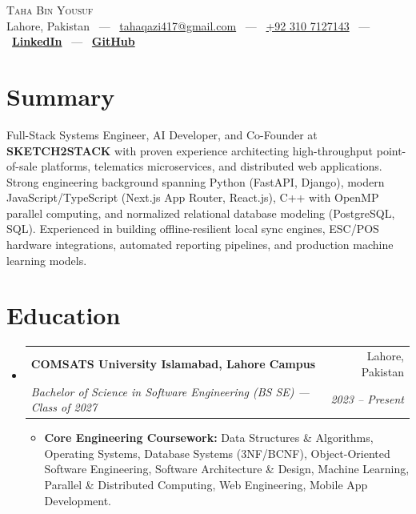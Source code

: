 \documentclass[letterpaper,10pt]{article}
\makeatletter
\newcommand{\resumeItem}[1]{
  \item\small{
    {#1 \vspace{-1.5pt}}
  }
}
\newcommand{\resumeSubheading}[4]{
  \vspace{1.5pt}\item
    \begin{tabular*}{0.98\textwidth}[t]{l@{\extracolsep{\fill}}r}
      \textbf{#1} & #2 \\
      \textit{\small#3} & \textit{\small #4} \\
    \end{tabular*}\vspace{-4pt}
}
\newcommand{\resumeSubHeadingListStart}{\begin{itemize}[leftmargin=0.15in, label={}]}
\newcommand{\resumeSubHeadingListEnd}{\end{itemize}\vspace{-2pt}}
\newcommand{\resumeItemListStart}{\begin{itemize}[leftmargin=0.15in]}
\newcommand{\resumeItemListEnd}{\end{itemize}\vspace{-3pt}}
\makeatother
\begin{document}

\begin{center}
    {\Huge \scshape Taha Bin Yousuf} \\ \vspace{5pt}
    \small Lahore, Pakistan \ --- \ 
    \href{mailto:tahaqazi417@gmail.com}{tahaqazi417@gmail.com} \ --- \ 
    \href{tel:+923107127143}{+92 310 7127143} \ --- \ 
    \href{https://linkedin.com/in/taha-bin-yousuf-851726414}{\textbf{LinkedIn}} \ --- \ 
    \href{https://github.com/taha-qazi}{\textbf{GitHub}}
\end{center}

\section{Summary}
\small{
Full-Stack Systems Engineer, AI Developer, and Co-Founder at \textbf{SKETCH2STACK} with proven experience architecting high-throughput point-of-sale platforms, telematics microservices, and distributed web applications. Strong engineering background spanning Python (FastAPI, Django), modern JavaScript/TypeScript (Next.js App Router, React.js), C++ with OpenMP parallel computing, and normalized relational database modeling (PostgreSQL, SQL). Experienced in building offline-resilient local sync engines, ESC/POS hardware integrations, automated reporting pipelines, and production machine learning models.
}

\section{Education}
  \resumeSubHeadingListStart
    \resumeSubheading
      {COMSATS University Islamabad, Lahore Campus}{Lahore, Pakistan}
      {Bachelor of Science in Software Engineering (BS SE) --- Class of 2027}{2023 -- Present}
      \resumeItemListStart
        \resumeItem{\textbf{Core Engineering Coursework:} Data Structures \& Algorithms, Operating Systems, Database Systems (3NF/BCNF), Object-Oriented Software Engineering, Software Architecture \& Design, Machine Learning, Parallel \& Distributed Computing, Web Engineering, Mobile App Development.}
      \resumeItemListEnd
  \resumeSubHeadingListEnd
\end{document}
